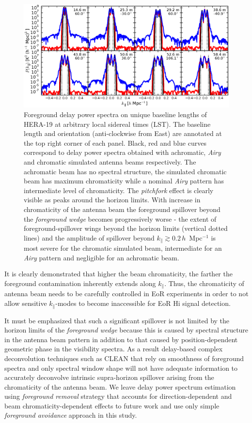 \documentclass[preprint2,iop,numberedappendix,twocolappendix,appendixfloats]{emulateapj}
\begin{document}
\begin{figure}[htb]
  \centering
  \includegraphics[width=\linewidth]{asm_foreground_eor_beam_chromaticity_fullband_bhw2.0.eps}
  \caption{Foreground delay power spectra on unique baseline lengths of HERA-19 at arbitrary local sidereal times (LST). The baseline length and orientation (anti-clockwise from East) are annotated at the top right corner of each panel. Black, red and blue curves correspond to delay power spectra obtained with achromatic, {\it Airy} and chromatic simulated antenna beams respectively. The achromatic beam has no spectral structure, the simulated chromatic beam has maximum chromaticity while a nominal {\it Airy} pattern has intermediate level of chromaticity. The {\it pitchfork} effect is clearly visible as peaks around the horizon limits. With increase in chromaticity of the antenna beam the foreground spillover beyond the {\it foreground wedge} becomes progressively worse - the extent of foreground-spillover wings beyond the horizon limits (vertical dotted lines) and the amplitude of spillover beyond $k_\parallel\gtrsim 0.2\,h$~Mpc$^{-1}$ is most severe for the chromatic simulated beam, intermediate for an {\it Airy} pattern and negligible for an achromatic beam.}
  \label{fig:asm-dps-beam-chromaticity-baselines}
\end{figure}

It is clearly demonstrated that higher the beam chromaticity, the farther the foreground contamination inherently extends along $k_\parallel$. Thus, the chromaticity of antenna beam needs to be carefully controlled in EoR experiments in order to not allow sensitive $k_\parallel$-modes to become inaccessible for EoR H{\sc i} signal detection.

It must be emphasized that such a significant spillover is not limited by the horizon limits of the {\it foreground wedge} because this is caused by spectral structure in the antenna beam pattern in addition to that caused by position-dependent geometric phase in the visibility spectra. As a result delay-based complex deconvolution techniques such as CLEAN \citep{tay99,par09,par12b} that rely on smoothness of foreground spectra and only spectral window shape will not have adequate information to accurately deconvolve intrinsic supra-horizon spillover arising from the chromaticity of the antenna beam. We leave delay power spectrum estimation using {\it foreground removal} strategy that accounts for direction-dependent and beam chromaticity-dependent effects to future work and use only simple {\it foreground avoidance} approach in this study.
\end{document}
